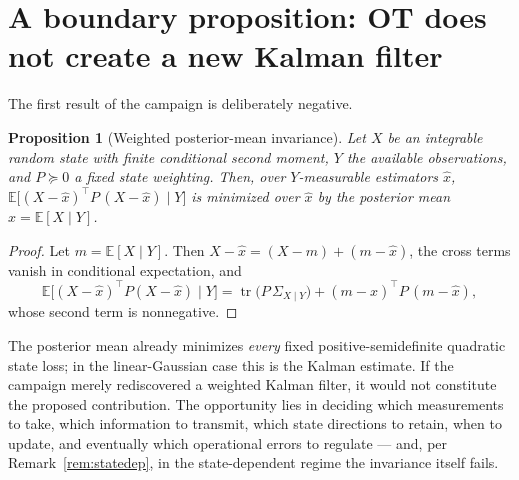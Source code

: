 \documentclass{article}
\newtheorem{proposition}{Proposition}
\theoremstyle{definition}
\theoremstyle{remark}
\newcommand{\E}{\mathbb{E}}
\newcommand{\tr}{\operatorname{tr}}
\newcommand{\Sig}{\Sigma}
\begin{document}
\section{A boundary proposition: OT does not create a new Kalman filter}
\label{sec:boundary}

The first result of the campaign is deliberately negative.

\begin{proposition}[Weighted posterior-mean invariance]
\label{prop:invariance}
Let $X$ be an integrable random state with finite conditional second
moment, $Y$ the available observations, and $P\succeq 0$ a fixed state
weighting. Then, over $Y$-measurable estimators $\hat x$,
$\E\big[(X-\hat x)^{\top}P\,(X-\hat x)\mid Y\big]$
is minimized over $\hat x$ by the posterior mean $\hat x=\E[X\mid Y]$.
\end{proposition}

\begin{proof}
Let $m=\E[X\mid Y]$. Then $X-\hat x=(X-m)+(m-\hat x)$, the cross terms vanish
in conditional expectation, and
\begin{equation*}
\E\big[(X-\hat x)^{\top}P(X-\hat x)\mid Y\big]
=\tr\!\big(P\,\Sig_{X\mid Y}\big)+(m-\hat x)^{\top}P\,(m-\hat x),
\end{equation*}
whose second term is nonnegative.
\end{proof}

The posterior mean already minimizes \emph{every} fixed positive-semidefinite
quadratic state loss; in the linear-Gaussian case this is the Kalman
estimate. If the campaign merely rediscovered a weighted Kalman filter, it
would not constitute the proposed contribution. The opportunity lies in
deciding which measurements to take, which information to transmit, which
state directions to retain, when to update, and eventually which operational
errors to regulate --- and, per Remark~\ref{rem:statedep}, in the
state-dependent regime the invariance itself fails.
\end{document}
